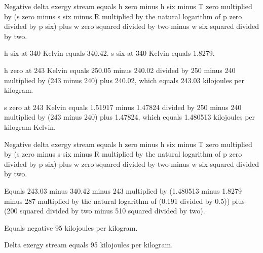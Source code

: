 Negative delta exergy stream equals h zero minus h six minus T zero multiplied by (s zero minus s six minus R multiplied by the natural logarithm of p zero divided by p six) plus w zero squared divided by two minus w six squared divided by two.  

h six at 340 Kelvin equals 340.42.  
s six at 340 Kelvin equals 1.8279.  

h zero at 243 Kelvin equals 250.05 minus 240.02 divided by 250 minus 240 multiplied by (243 minus 240) plus 240.02, which equals 243.03 kilojoules per kilogram.  

s zero at 243 Kelvin equals 1.51917 minus 1.47824 divided by 250 minus 240 multiplied by (243 minus 240) plus 1.47824, which equals 1.480513 kilojoules per kilogram Kelvin.  

Negative delta exergy stream equals h zero minus h six minus T zero multiplied by (s zero minus s six minus R multiplied by the natural logarithm of p zero divided by p six) plus w zero squared divided by two minus w six squared divided by two.  

Equals 243.03 minus 340.42 minus 243 multiplied by (1.480513 minus 1.8279 minus 287 multiplied by the natural logarithm of (0.191 divided by 0.5)) plus (200 squared divided by two minus 510 squared divided by two).  

Equals negative 95 kilojoules per kilogram.  

Delta exergy stream equals 95 kilojoules per kilogram.